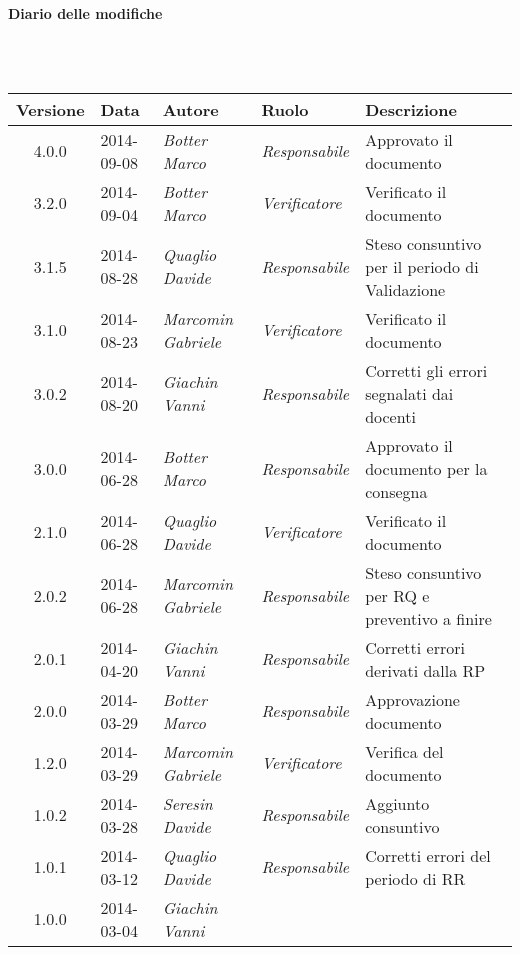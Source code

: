 \noindent\begin{Large}\textbf{Diario delle modifiche}\end{Large}\\
\\
\begin{small}
\begin{tabular}{|c|p{1.8cm}|p{2.8cm}|p{2.8cm}|p{3.5cm}|}
\hline
Versione & Data & Autore & Ruolo & Descrizione \\
\hline
\hline
4.0.0 & 2014-09-08 & 
\textit{Botter Marco} &
\textit{Responsabile} & Approvato il documento\\
\hline
3.2.0 & 2014-09-04 & 
\textit{Botter Marco} &
\textit{Verificatore} &  Verificato il documento \\
\hline
3.1.5 & 2014-08-28 & 
\textit{Quaglio Davide} &
\textit{Responsabile} &  Steso consuntivo per il periodo di Validazione \\
\hline
3.1.0 & 2014-08-23 & 
\textit{Marcomin Gabriele} &
\textit{Verificatore} &  Verificato  il documento\\
\hline
3.0.2 & 2014-08-20 & 
\textit{Giachin Vanni} &
\textit{Responsabile} &  Corretti gli errori segnalati dai docenti\\
\hline
3.0.0 & 2014-06-28 & 
\textit{Botter Marco} &
\textit{Responsabile} &  Approvato il documento per la consegna\\
\hline
2.1.0 & 2014-06-28 & 
\textit{Quaglio Davide} &
\textit{Verificatore} &  Verificato il documento\\
\hline
2.0.2 & 2014-06-28 & 
\textit{Marcomin Gabriele} &
\textit{Responsabile} &  Steso consuntivo per RQ e preventivo a finire\\
\hline
2.0.1 & 2014-04-20 & 
\textit{Giachin Vanni} &
\textit{Responsabile} &  Corretti errori derivati dalla RP\\
\hline
2.0.0 & 2014-03-29 & 
\textit{Botter Marco} &
\textit{Responsabile} &  Approvazione documento\\
\hline
1.2.0 & 2014-03-29 & 
\textit{Marcomin Gabriele} &
\textit{Verificatore} &  Verifica del documento\\
\hline
1.0.2 & 2014-03-28 & 
\textit{Seresin Davide} &
\textit{Responsabile} &  Aggiunto consuntivo\\
\hline
1.0.1 & 2014-03-12 & 
\textit{Quaglio Davide} &
\textit{Responsabile} &  Corretti errori del periodo di RR\\
\hline
1.0.0 & 2014-03-04 & 
\textit{Giachin Vanni} &

\end{tabular}
\end{small}
